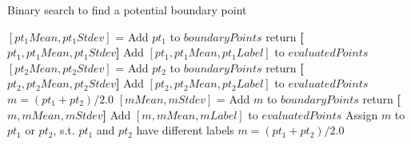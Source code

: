 \begin{algorithm}[H] {
\caption{Binary search to find a potential boundary point}
\label{alg:binSearch}
\begin{algorithmic}[1]
    \State $[pt_1Mean, pt_1Stdev]$ = 
            \State Add $pt_1$ to $boundaryPoints$
            \State return \textbf{[$pt_1, pt_1Mean, pt_1Stdev$]}
        \Else 
            \State Add $[pt_1,pt_1Mean,pt_1Label]$ to $evaluatedPoints$
    \EndIf
    \State $[pt_2Mean, pt_2Stdev]$ = 
            \State Add $pt_2$ to $boundaryPoints$
            \State return \textbf{[$pt_2, pt_2Mean, pt_2Stdev$]}
        \Else 
            \State Add $[pt_2,pt_2Mean,pt_2Label]$ to $evaluatedPoints$
    \EndIf
    \State $m = (pt_1 + pt_2)/2.0$ 
        \State $[mMean, mStdev]$ = 
            \State Add $m$ to $boundaryPoints$
            \State return \textbf{[$m, mMean, mStdev$]}
        \Else 
            \State Add $[m,mMean,mLabel]$ to $evaluatedPoints$ 
        \EndIf
        \State Assign $m$ to $pt_1$ or $pt_2$, s.t. $pt_1$ and $pt_2$ have different labels
        \State $m = (pt_1 + pt_2)/2.0$ 
    \EndWhile
\EndProcedure
\end{algorithmic}
}
\end{algorithm}